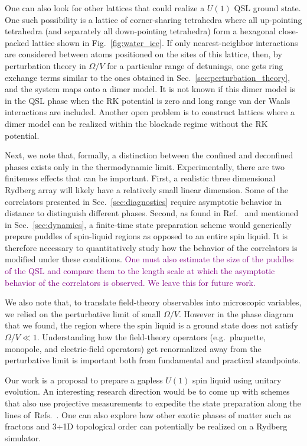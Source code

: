 \documentclass[twocolumn,superscriptaddress,amsmath,amssymb,aps,prx,nofootinbib]{revtex4-2}
\newcommand{\newtext}[1]{\textcolor{purple}{#1}}
\begin{document}
One can also look for other lattices that could realize a $U(1)$ QSL ground state. One such possibility is a lattice of corner-sharing tetrahedra where all up-pointing tetrahedra (and separately all down-pointing tetrahedra) form a hexagonal close-packed lattice shown in Fig.~\ref{fig:water_ice}. If only nearest-neighbor interactions are considered between atoms positioned on the sites of this lattice, then, by perturbation theory in $\Omega/V$ for a particular range of detunings, one gets ring exchange terms similar to the ones obtained in Sec.~\ref{sec:perturbation_theory}, and the system maps onto a dimer model. It is not known if this dimer model is in the QSL phase when the RK potential is zero and long range van der Waals interactions are included. Another open problem is to construct lattices where a dimer model can be realized within the blockade regime without the RK potential.

Next, we note that, formally, a distinction between the confined and deconfined phases exists only in the thermodynamic limit. Experimentally, there are two finiteness effects that can be important. First, a realistic three dimensional Rydberg array will likely have a relatively small linear dimension.  
Some of the correlators presented in Sec.~\ref{sec:diagnostics} require asymptotic behavior in distance to distinguish different phases. Second, as found in Ref.~\cite{sahay2022quantum} and mentioned in Sec.~\ref{sec:dynamics}, a finite-time state preparation scheme would generically prepare puddles of spin-liquid regions as opposed to an entire spin liquid. It is therefore necessary to quantitatively study how the behavior of the correlators is modified under these conditions. \newtext{One must also estimate the size of the puddles of the QSL and compare them to the length scale at which the asymptotic behavior of the correlators is observed. We leave this for future work.} 

We also note that, to translate field-theory observables into microscopic variables, we relied on the perturbative limit of small $\Omega/V$. However in the phase diagram that we found, the region where the spin liquid is a ground state does not satisfy $\Omega/V\ll1$. Understanding how the field-theory operators (e.g.~plaquette, monopole, and electric-field operators) get renormalized away from the perturbative limit is important both from fundamental and practical standpoints.

Our work is a proposal to prepare a gapless $U(1)$ spin liquid using unitary evolution. An interesting research direction would be to come up with schemes that also use projective measurements to expedite the state preparation along the lines of~Refs.~\cite{tantivasadakarn2022shortest,lavasani2022monitored}. One can also explore how other exotic phases of matter such as fractons and 3+1D topological order can potentially be realized on a Rydberg simulator.
\end{document}
